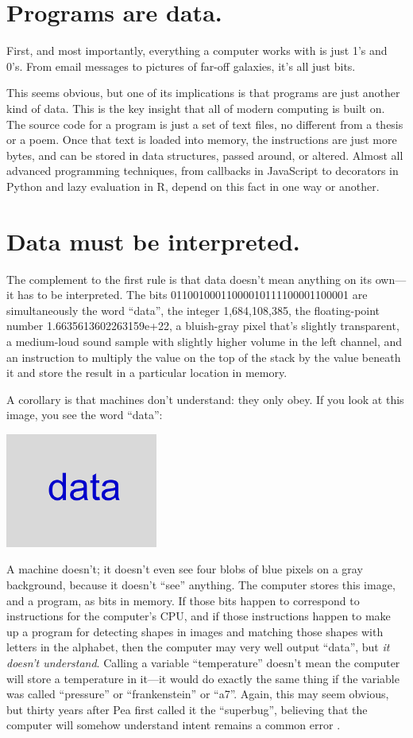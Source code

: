 \documentclass[10pt,letterpaper]{article}
\newcommand{\rulemajor}[1]{\section{#1}}
\begin{document}
\rulemajor{Programs are data.}

First, and most importantly, everything a computer works with is just 1's and
0's.  From email messages to pictures of far-off galaxies, it's all just bits.

This seems obvious, but one of its implications is that programs are just
another kind of data.  This is the key insight that all of modern computing is
built on.  The source code for a program is just a set of text files, no
different from a thesis or a poem.  Once that text is loaded into memory, the
instructions are just more bytes, and can be stored in data structures, passed
around, or altered.  Almost all advanced programming techniques, from callbacks
in JavaScript to decorators in Python and lazy evaluation in R, depend on this
fact in one way or another.

\rulemajor{Data must be interpreted.}

The complement to the first rule is that data doesn't mean anything on its
own---it has to be interpreted.  The bits 01100100011000010111100001100001 are
simultaneously the word ``data'', the integer 1,684,108,385, the floating-point
number 1.6635613602263159e+22, a bluish-gray pixel that's slightly transparent,
a medium-loud sound sample with slightly higher volume in the left channel, and
an instruction to multiply the value on the top of the stack by the value
beneath it and store the result in a particular location in memory.

A corollary is that machines don't understand: they only obey.  If you look at
this image, you see the word ``data'':

\includegraphics[width=5.0cm]{data.png}

A machine doesn't; it doesn't even see four blobs of blue pixels on a gray
background, because it doesn't ``see'' anything.  The computer stores this
image, and a program, as bits in memory.  If those bits happen to correspond to
instructions for the computer's CPU, and if those instructions happen to make up
a program for detecting shapes in images and matching those shapes with letters
in the alphabet, then the computer may very well output ``data'', but \emph{it
  doesn't understand}.  Calling a variable ``temperature'' doesn't mean the
computer will store a temperature in it---it would do exactly the same thing if
the variable was called ``pressure'' or ``frankenstein'' or ``a7''.  Again, this
may seem obvious, but thirty years after Pea first called it the ``superbug'',
believing that the computer will somehow understand intent remains a common
error \cite{Pea1986}.
\end{document}
